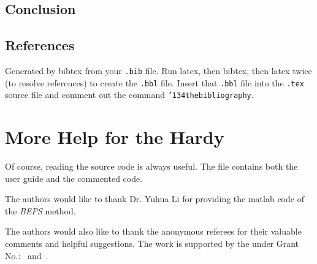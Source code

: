 \documentclass[sigconf]{acmart}
\begin{document}
\subsection{Conclusion}
\subsection{References}

Generated by bibtex from your \texttt{.bib} file.  Run latex, then
bibtex, then latex twice (to resolve references) to create the
\texttt{.bbl} file.  Insert that \texttt{.bbl} file into the
\texttt{.tex} source file and comment out the command
\texttt{{\char'134}thebibliography}.


\section{More Help for the Hardy}

Of course, reading the source code is always useful.  The file
 contains both the user guide and the commented code.

\begin{acks}

  The authors would like to thank Dr. Yuhua Li for providing the
  matlab code of the \textit{BEPS} method.

  The authors would also like to thank the anonymous referees for
  their valuable comments and helpful suggestions. The work is
  supported by the  under Grant
  No.:~
  and~.

\end{acks}


 
\end{document}
